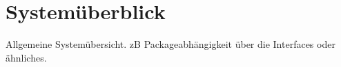 \section{Systemüberblick}

Allgemeine Systemübersicht. zB Packageabhängigkeit über die Interfaces oder ähnliches.
